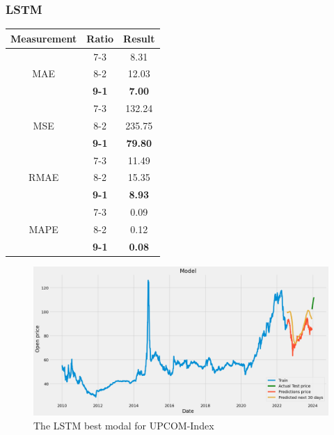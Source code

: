 \documentclass{ieeeojies}
\begin{document}
\subsubsection{LSTM}
\begin{table}[H]
    \centering
    \begin{tabular}{|c|c|c|}
        \hline
         Measurement & Ratio &  Result  \\
        \hline
             & 7-3 & 8.31  \\
        MAE  & 8-2 & 12.03  \\
            & \textbf{9-1} &\textbf{ 7.00}  \\
        \hline
           & 7-3 & 132.24  \\
        MSE  & 8-2 & 235.75  \\
            & \textbf{9-1} & \textbf{79.80}  \\
        \hline
           & 7-3 & 11.49  \\
        RMAE  & 8-2 & 15.35  \\
            & \textbf{9-1} & \textbf{8.93}  \\
        \hline
           & 7-3 & 0.09  \\
        MAPE  & 8-2 & 0.12  \\
            & \textbf{9-1} & \textbf{0.08}  \\
        \hline
    \end{tabular}
    \label{table:example}
\end{table}
\begin{figure}[H]
    \centering
    \includegraphics[width=0.8\linewidth]{LSTM-UPC-91.png}
    \caption{The LSTM best modal for UPCOM-Index}
    \label{fig:example}
\end{figure}
\end{document}
